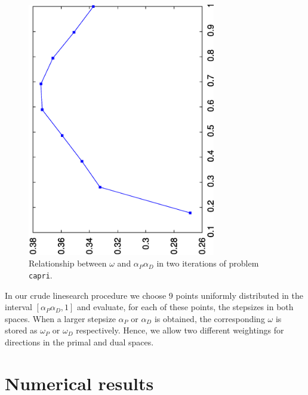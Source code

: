 \begin{figure}[ht]
\begin{minipage}[t]{0.54\textwidth}
  \includegraphics[width=0.73\textwidth,angle=-90]{figures/alphaomega-2.eps}
  \end{minipage}
  \caption{Relationship between $\omega$ and $\alpha_P\alpha_D$ in two iterations of problem {\tt capri}.}
  \label{fig:alphaomega}
\end{figure}

In our crude linesearch procedure we choose 9 points uniformly 
distributed in the interval $[\alpha_P\alpha_D, 1]$ 
and evaluate, for each of these points, the stepsizes in both spaces. 
When a larger stepsize $\alpha_P$ or $\alpha_D$ is obtained, 
the corresponding $\omega$ is stored as $\omega_P$ or $\omega_D$ 
respectively. Hence, we allow two different weightings for directions 
in the primal and dual spaces.

%
%
\section{Numerical results}
\label{NumRes}

